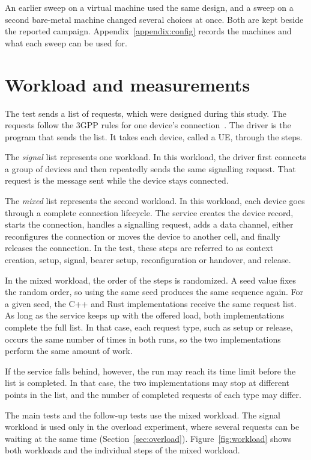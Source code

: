 \documentclass[english,oneside,a4paper,censored,csm,software-track-2020]{HYthesisML}
\begin{document}
An earlier sweep on a virtual machine used the same design, and a sweep on a
second bare-metal machine changed several choices at once. Both are kept
beside the reported campaign. Appendix~\ref{appendix:config} records the
machines and what each sweep can be used for.

\section[Workload and measurements]{Workload and measurements\label{sec:workload}}
The test sends a list of requests, which were designed during this study. The requests
follow the 3GPP rules for one device's
connection~\cite{3gpp38401,3gpp38331}. The driver is the program that sends
the list. It takes each device, called a UE, through the steps.

The \emph{signal} list represents one workload. In this workload, the
driver first connects a group of devices and then repeatedly sends the same
signalling request. That request is the message sent while the device stays
connected.

The \emph{mixed} list represents the second workload. In this workload,
each device goes through a complete connection lifecycle. The service
creates the device record, starts the connection, handles a signalling
request, adds a data channel, either reconfigures the connection or moves
the device to another cell, and finally releases the connection. In the
test, these steps are referred to as context creation, setup, signal,
bearer setup, reconfiguration or handover, and release.

In the mixed workload, the order of the steps is randomized. A seed value
fixes the random order, so using the same seed produces the same sequence
again. For a given seed, the C++ and Rust implementations receive the same
request list. As long as the service keeps up with the offered load, both
implementations complete the full list. In that case, each request type,
such as setup or release, occurs the same number of times in both runs, so
the two implementations perform the same amount of work.

If the service falls behind, however, the run may reach its time limit
before the list is completed. In that case, the two implementations may stop
at different points in the list, and the number of completed requests of
each type may differ.

The main tests and the follow-up tests use the mixed workload. The signal
workload is used only in the overload experiment, where several requests can
be waiting at the same time (Section~\ref{sec:overload}).
Figure~\ref{fig:workload} shows both workloads and the individual steps of
the mixed workload.
\end{document}
